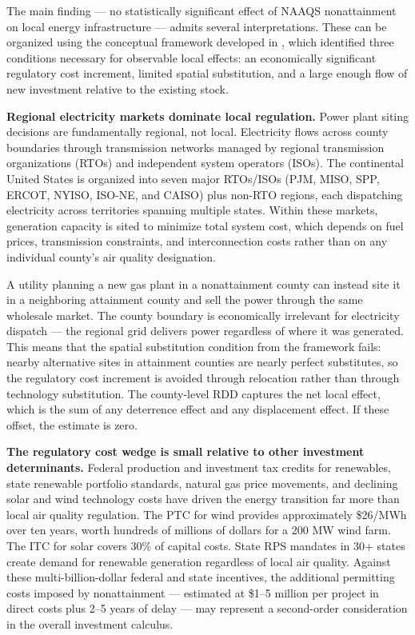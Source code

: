 \documentclass[12pt]{article}
\begin{document}
The main finding --- no statistically significant effect of NAAQS nonattainment on local energy infrastructure --- admits several interpretations. These can be organized using the conceptual framework developed in , which identified three conditions necessary for observable local effects: an economically significant regulatory cost increment, limited spatial substitution, and a large enough flow of new investment relative to the existing stock.

\textbf{Regional electricity markets dominate local regulation.} Power plant siting decisions are fundamentally regional, not local. Electricity flows across county boundaries through transmission networks managed by regional transmission organizations (RTOs) and independent system operators (ISOs). The continental United States is organized into seven major RTOs/ISOs (PJM, MISO, SPP, ERCOT, NYISO, ISO-NE, and CAISO) plus non-RTO regions, each dispatching electricity across territories spanning multiple states. Within these markets, generation capacity is sited to minimize total system cost, which depends on fuel prices, transmission constraints, and interconnection costs rather than on any individual county's air quality designation.

A utility planning a new gas plant in a nonattainment county can instead site it in a neighboring attainment county and sell the power through the same wholesale market. The county boundary is economically irrelevant for electricity dispatch --- the regional grid delivers power regardless of where it was generated. This means that the spatial substitution condition from the framework fails: nearby alternative sites in attainment counties are nearly perfect substitutes, so the regulatory cost increment is avoided through relocation rather than through technology substitution. The county-level RDD captures the net local effect, which is the sum of any deterrence effect and any displacement effect. If these offset, the estimate is zero.

\textbf{The regulatory cost wedge is small relative to other investment determinants.} Federal production and investment tax credits for renewables, state renewable portfolio standards, natural gas price movements, and declining solar and wind technology costs have driven the energy transition far more than local air quality regulation. The PTC for wind provides approximately \$26/MWh over ten years, worth hundreds of millions of dollars for a 200 MW wind farm. The ITC for solar covers 30\% of capital costs. State RPS mandates in 30+ states create demand for renewable generation regardless of local air quality. Against these multi-billion-dollar federal and state incentives, the additional permitting costs imposed by nonattainment --- estimated at \$1--5 million per project in direct costs plus 2--5 years of delay \citep{greenstone2002impact} --- may represent a second-order consideration in the overall investment calculus.
\end{document}

